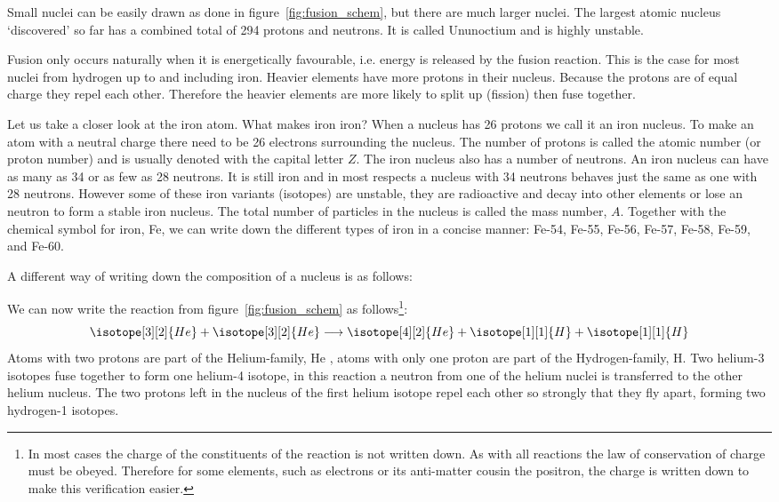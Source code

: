 Small nuclei can be easily drawn as done in figure~\ref{fig:fusion_schem}, but there are much larger nuclei. The largest atomic nucleus `discovered' so far has a combined total of 294 protons and neutrons. It is called Ununoctium and is highly unstable.

Fusion only occurs naturally when it is energetically favourable, i.e. energy is released by the fusion reaction. This is the case for most nuclei from hydrogen up to and including iron. Heavier elements have more protons in their nucleus. Because the protons are of equal charge they repel each other. Therefore the heavier elements are more likely to split up (fission) then fuse together.

Let us take a closer look at the iron atom. What makes iron iron? When a nucleus has 26 protons we call it an iron nucleus. To make an atom with a neutral charge there need to be 26 electrons surrounding the nucleus. The number of protons is called the atomic number (or proton number) and is usually denoted with the capital letter $Z$. The iron nucleus also has a number of neutrons. An iron nucleus can have as many as 34 or as few as 28 neutrons. It is still iron and in most respects a nucleus with 34 neutrons behaves just the same as one with 28 neutrons. However some of these iron variants (isotopes) are unstable, they are radioactive and decay into other elements or lose an neutron to form a stable iron nucleus.
The total number of particles in the nucleus is called the mass number, $A$. Together with the chemical symbol for iron, Fe, we can write down the different types of iron in a concise manner: Fe-54, Fe-55, Fe-56, Fe-57, Fe-58, Fe-59, and Fe-60.

A different way of writing down the composition of a nucleus is as follows:
\begin{center}  \end{center}
We can now write the reaction from figure~\ref{fig:fusion_schem} as follows\footnote{In most cases the charge of the constituents of the reaction is not written down. As with all reactions the law of conservation of charge must be obeyed. Therefore for some elements, such as electrons or its anti-matter cousin the positron, the charge is written down to make this verification easier.}:
\begin{equation*}
\isotope[3][2]{He} + \isotope[3][2]{He} \longrightarrow \isotope[4][2]{He} + \isotope[1][1]{H} + \isotope[1][1]{H}
\end{equation*}
Atoms with two protons are part of the Helium-family, He , atoms with only one proton are part of the Hydrogen-family, H. Two helium-3 isotopes fuse together to form one helium-4 isotope, in this reaction a neutron from one of the helium nuclei is transferred to the other helium nucleus. The two protons left in the nucleus of the first helium isotope repel each other so strongly that they fly apart, forming two hydrogen-1 isotopes.


